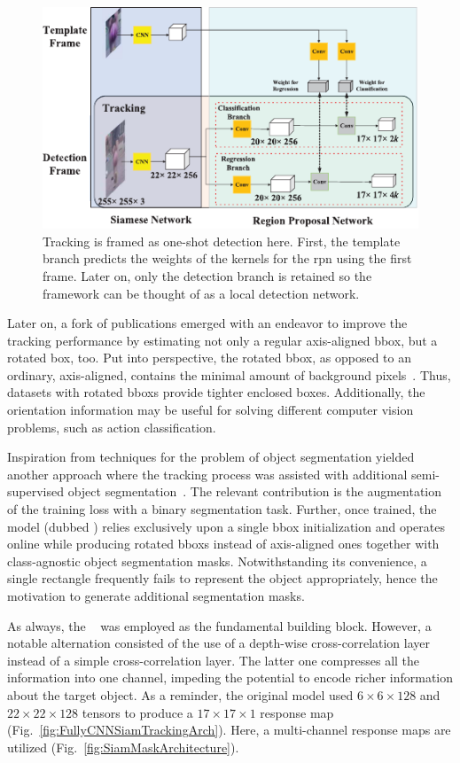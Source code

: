 \begin{figure}[t]
    \centerline{\includegraphics[width=0.7\linewidth]{figures/theoretical_foundations/siam_rpn_one_shot_detection.pdf}}
    \caption[Tracking as one-shot detection]{Tracking is framed as one-shot detection here. First, the template branch predicts the weights of the kernels for the \gls{rpn} using the first frame. Later on, only the detection branch is retained so the framework can be thought of as a local detection network. }
    \label{fig:SiamRPNOneShotDetection}
\end{figure}

Later on, a fork of publications emerged with an endeavor to improve the tracking performance by estimating not only a regular axis-aligned \gls{bbox}, but a rotated box, too. Put into perspective, the rotated \gls{bbox}, as opposed to an ordinary, axis-aligned, contains the minimal amount of background pixels~\cite{chen2019rotbboxes}. Thus, datasets with rotated \glspl{bbox} provide tighter enclosed boxes. Additionally, the orientation information may be useful for solving different computer vision problems, such as action classification.

Inspiration from techniques for the problem of object segmentation yielded another approach where the tracking process was assisted with additional semi-supervised object segmentation~\cite{wang2019siammask}. The relevant contribution is the augmentation of the training loss with a binary segmentation task. Further, once trained, the model (dubbed ) relies exclusively upon a single \gls{bbox} initialization and operates online while producing rotated \glspl{bbox} instead of axis-aligned ones together with class-agnostic object segmentation masks. Notwithstanding its convenience, a single rectangle frequently fails to represent the object appropriately, hence the motivation to generate additional segmentation masks.

As always, the ~\cite{bertinetto2016siamfc} was employed as the fundamental building block. However, a notable alternation consisted of the use of a depth-wise cross-correlation layer instead of a simple cross-correlation layer. The latter one compresses all the information into one channel, impeding the potential to encode richer information about the target object. As a reminder, the original model used $6 \times 6 \times 128$ and $22 \times 22 \times 128$ tensors to produce a $17 \times 17 \times 1$ response map (Fig.~\ref{fig:FullyCNNSiamTrackingArch}). Here, a multi-channel response maps are utilized (Fig.~\ref{fig:SiamMaskArchitecture}).

